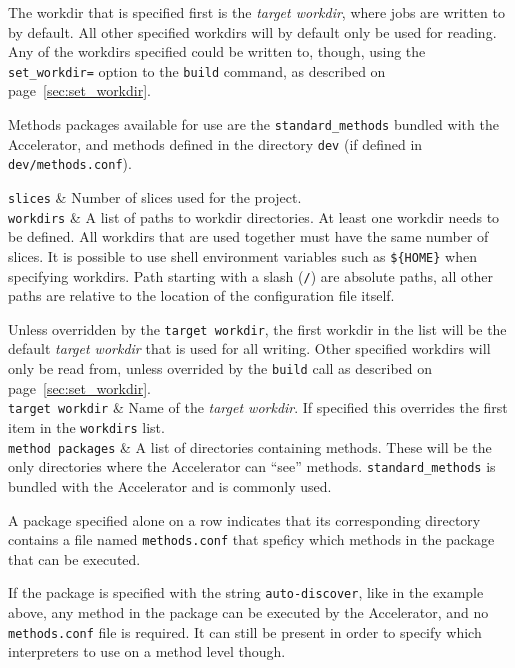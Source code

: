 The workdir that is specified first is the \textsl{target workdir},
where jobs are written to by default.  All other specified workdirs
will by default only be used for reading.  Any of the workdirs
specified could be written to, though, using the
\texttt{set\_workdir=} option to the \texttt{build} command, as
described on page~\ref{sec:set_workdir}.

Methods packages available for use are the \texttt{standard\_methods} bundled
with the Accelerator, and methods defined in the
directory \texttt{dev} (if defined in \texttt{dev/methods.conf}).

\starttabletwo

\RPtwo \texttt{slices} & Number of slices used for the project.\\[1ex]

\RPtwo \texttt{workdirs} & A list of paths to workdir directories.  At
least one workdir needs to be defined.  All workdirs that are used
together must have the same number of slices.  It is possible to use
shell environment variables such as \texttt{\$\{HOME\}} when
specifying workdirs.  Path starting with a slash (\texttt{/}) are
absolute paths, all other paths are relative to the location of the
configuration file itself.

Unless overridden by the \texttt{target workdir}, the first workdir in
the list will be the default \textsl{target workdir} that is used for
all writing.  Other specified workdirs will only be read from, unless
overrided by the \texttt{build} call as described on
page~\ref{sec:set_workdir}.\\[1ex]

\RPtwo \texttt{target workdir} & Name of the \textsl{target workdir}.
If specified this overrides the first item in the \texttt{workdirs}
list.\\[1ex]

\RPtwo \texttt{method packages} & A list of directories containing
methods.  These will be the only directories where the Accelerator can
``see'' methods.  \texttt{standard\_methods} is bundled with the
Accelerator and is commonly used.

A package specified alone on a row indicates that its corresponding
directory contains a file named \texttt{methods.conf} that speficy
which methods in the package that can be executed.

If the package is specified with the string \texttt{auto-discover},
like in the example above, any method in the package can be executed
by the Accelerator, and no \texttt{methods.conf} file is required.  It
can still be present in order to specify which interpreters to use on
a method level though.\\[1ex]


